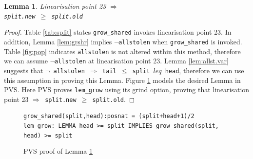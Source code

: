 \documentclass{sig-alternate-br}
\newtheorem{lemma}{Lemma}
\begin{document}
\begin{lemma}
	Linearisation point 23 \texttt{$\Rightarrow$\\split.new $\geq$ split.old}
	\label{lem:growincrsplit}
\end{lemma}
\begin{proof}
	Table \ref{tab:split} states \texttt{grow\_shared} invokes linearisation point 23.
	In addition, Lemma \ref{lem:grshr} implies \texttt{$\neg$allstolen} when \texttt{grow\_shared} is invoked.
	Table \ref{fig:pop} indicates \texttt{allstolen} is not altered within this method, therefore we can assume \texttt{$\neg$allstolen} at linearisation point 23.
	Lemma \ref{lem:allst.var} suggests that \texttt{$\neg$ allstolen $\Rightarrow$ tail $\leq$ split $leq$ head}, therefore we can use this assumption in proving this Lemma.
	Figure \ref{pvs:growincrsplit} models the desired Lemma in PVS.
	Here PVS proves \texttt{lem\_grow} using its grind option, proving that linearisation point 23 \texttt{$\Rightarrow$ split.new $\geq$ split.old}.
\end{proof}
\begin{figure}[h]
	\texttt{grow\_shared(split,head):posnat = (split+head+1)/2}\\
	\texttt{lem\_grow: LEMMA head >= split IMPLIES grow\_shared(split, head) >= split}
	\caption{PVS proof of Lemma \ref{lem:growincrsplit}}
	\label{pvs:growincrsplit}
\end{figure}
\end{document}
